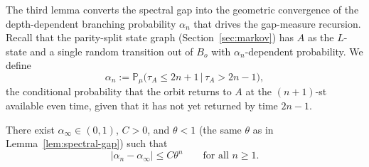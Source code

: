 The third lemma converts the spectral gap into the geometric
convergence of the depth-dependent branching probability $\alpha_n$
that drives the gap-measure recursion. Recall that the parity-split
state graph (Section~\ref{sec:markov}) has $A$ as the $L$-state and a
single random transition out of $B_o$ with $\alpha_n$-dependent
probability. We define
\[
    \alpha_n := \mathbb{P}_{\!\mu}\bigl(\tau_A \leq 2n + 1 \,\big|\, \tau_A > 2n - 1 \bigr),
\]
the conditional probability that the orbit returns to $A$ at the
$(n+1)$-st available even time, given that it has not yet returned by
time $2n - 1$.

\begin{lemma}
\label{lem:alpha-convergence}
There exist $\alpha_\infty \in (0, 1)$, $C > 0$, and $\theta < 1$
(the same $\theta$ as in Lemma~\ref{lem:spectral-gap}) such that
\[
    |\alpha_n - \alpha_\infty| \leq C \theta^n \qquad \text{for all } n \geq 1.
\]
\end{lemma}

